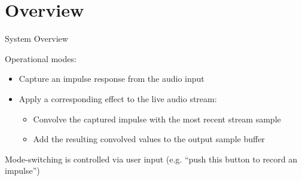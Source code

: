 \section{Overview}


\begin{frame}{System Overview}

    Operational modes:

    \pause
    \begin{itemize}[<+->]
        \item Capture an impulse response from the audio input

        \item Apply a corresponding effect to the live audio stream:
        \begin{itemize}[<.->]
            \item Convolve the captured impulse with the most recent stream sample
            \item Add the resulting convolved values to the output sample buffer
        \end{itemize}
    \end{itemize}

    \pause[\thebeamerpauses]
    Mode-switching is controlled via user input (e.g. ``push this button to record an impulse'')

\end{frame}
